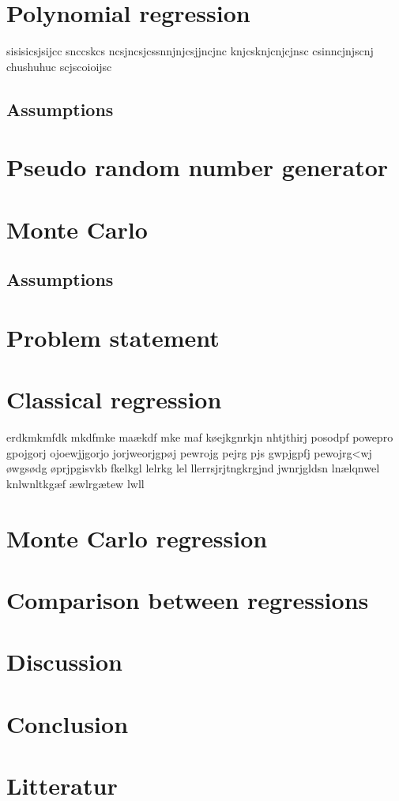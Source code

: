 \documentclass{article}
\begin{document}
	\section{Polynomial regression}
 	sisisicsjsijcc snccskcs ncsjncsjcssnnjnjcsjjncjnc knjcsknjcnjcjnsc csinncjnjscnj chushuhuc scjscoioijsc
	\subsection{Assumptions}
	\newpage
	\section{Pseudo random number generator}
	\newpage
	\section{Monte Carlo}
	\subsection{Assumptions}
	\newpage
	\section{Problem statement}
	\newpage
	\section{Classical regression}
 	erdkmkmfdk mkdfmke maækdf mke maf  køejkgnrkjn nhtjthirj posodpf powepro gpojgorj ojoewjjgorjo jorjweorjgpøj pewrojg pejrg pjs gwpjgpfj pewojrg<wj  øwgsødg øprjpgisvkb fkelkgl lelrkg lel   llerrsjrjtngkrgjnd jwnrjgldsn  lnælqnwel knlwnltkgæf æwlrgætew lwll
	\newpage
	\section{Monte Carlo regression}
	\newpage
	\section{Comparison between regressions}
	\newpage
	\section{Discussion}
	\newpage
	\section{Conclusion}
	\newpage
 	\section{Litteratur}
  
\end{document}

